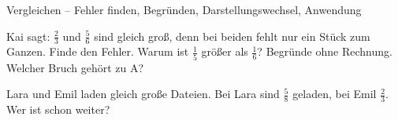 \begin{aufgabe}{Vergleichen – Fehler finden, Begründen, Darstellungswechsel, Anwendung}
\begin{teile}
\teil Kai sagt: $\frac{2}{3}$ und $\frac{5}{6}$ sind gleich groß, denn bei beiden fehlt nur ein Stück zum Ganzen. Finde den Fehler.
\teil Warum ist $\frac{1}{5}$ größer als $\frac{1}{6}$? Begründe ohne Rechnung.
\teil Welcher Bruch gehört zu A?

\leerfeld
\teil Lara und Emil laden gleich große Dateien. Bei Lara sind $\frac{5}{8}$ geladen, bei Emil $\frac{2}{3}$. Wer ist schon weiter?
\end{teile}
\end{aufgabe}
